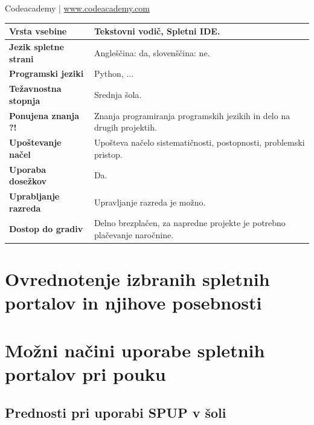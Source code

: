 \begin{osebnabox}[label={osebna:codeacademy}]{Codeacademy | \url{www.codeacademy.com}}
    \begin{tabular}{
  p{} |
  p{}  }
  \textbf{Vrsta vsebine} & Tekstovni vodič, Spletni IDE. \\
      \hline
  \textbf{Jezik spletne strani} &  Angleščina: da, slovenščina: ne. \\
      \hline
  \textbf{Programski jeziki} & Python, ... \\
      \hline
  \textbf{Težavnostna stopnja} & Srednja šola. \\
      \hline
  \textbf{Ponujena znanja ?!} & Znanja programiranja programskih jezikih
      in delo na drugih projektih. \\
      \hline
  \textbf{Upoštevanje načel} & Upošteva načelo sistematičnosti,
      postopnosti, problemski pristop. \\
      \hline
  \textbf{Uporaba dosežkov} & Da. \\
      \hline
  \textbf{Uprabljanje razreda} & Upravljanje razreda je možno. \\
      \hline
  \textbf{Dostop do gradiv} & Delno brezplačen, za napredne projekte je
      potrebno plačevanje naročnine. \\
\end{tabular}
\end{osebnabox}

\section{Ovrednotenje izbranih spletnih portalov in njihove posebnosti}
\label{sec:pregled_spletnih_portalov}


\section{Možni načini uporabe spletnih portalov pri pouku}
\label{sec:načini_uporabe_sp}

\subsection{Prednosti pri uporabi SPUP v šoli }
\label{sec:Prednosti_pri_uporavi_SPUP}


